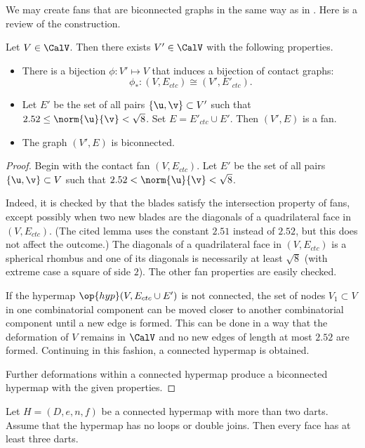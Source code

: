 We may create  fans that are biconnected graphs in the same way as in
\cite{Hales:2006:DCG}.  Here is a review
of the construction.



\begin{lemma}\label{lemma:V'-bi} 
Let $V\in \CalV$.  Then there exists $V'\in \CalV$ with
  the following properties.
\begin{itemize}
\item There is a bijection $\phi:V'\mapsto V$ that induces a bijection
  of contact graphs:
\[
\phi_*:(V,E_{ctc}) \cong (V',E'_{ctc}).
\]
\item Let $E'$ be the set of all pairs $\{\u,\v\}\subset V'$
  such that $2.52\le\norm{\u}{\v} <\sqrt8$.  Set $E =
  E'_{ctc}\cup E'$.  Then $(V',E)$ is a fan.
\item The graph $(V',E)$ is biconnected.
\end{itemize}
\end{lemma}

\begin{proof}
  Begin with the contact fan $(V,E_{ctc})$.  Let $E'$ be the set
  of all pairs $\{\u,\v\}\subset V$ such that
  $2.52<\norm{\u}{\v}<\sqrt8$.

   Indeed, it is checked by
  \cite[Lemma~4.30]{Hales:2006:DCG} that the blades satisfy the
  intersection property of fans, except possibly when two new blades
  are the diagonals of a quadrilateral face in $(V,E_{ctc})$.  (The
  cited lemma uses the constant $2.51$ instead of $2.52$, but this
  does not affect the outcome.)  The diagonals of a quadrilateral face
  in $(V,E_{ctc})$ is a spherical rhombus and one of its diagonals is
  necessarily at least $\sqrt8$ (with extreme case a square of side
  $2$).  The other fan properties are easily checked.

  If the hypermap $\op{hyp}(V,E_{ctc}\cup E')$ is not connected,
  the set of nodes $V_1\subset V$ in one combinatorial component can
  be moved closer to another combinatorial component until a new edge
  is formed.  This can be done in a way that the deformation of $V$
  remains in $\CalV$ and no new edges of length at most $2.52$ are formed.
  Continuing in this fashion, a connected hypermap is obtained.

  Further deformations within a connected hypermap produce a
  biconnected hypermap with the given properties.
\end{proof}


\begin{lemma}\label{lemma:dj}
Let $H=(D,e,n,f)$ be a connected hypermap with more than
two darts.  Assume that the hypermap has no loops or double joins. Then
every face has at least three darts.
\end{lemma}

